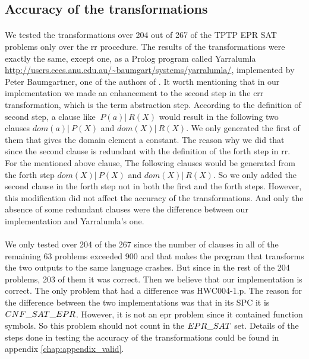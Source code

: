 \subsection{Accuracy of the transformations}
\paragraph{}
We tested the transformations over 204 out of 267 of the TPTP EPR SAT problems only over the \acf{rr} procedure. The results of the transformations were exactly the same, except one, as a Prolog program called Yarralumla \url{http://users.cecs.anu.edu.au/~baumgart/systems/yarralumla/}, implemented by Peter Baumgartner, one of the authors of \cite{BMUG06}. It worth mentioning that in our implementation we made an enhancement to the second step in the \ac{crr} transformation, which is the term abstraction step. According to the definition of second step, a clause like $~P(a)|~R(X)$ would result in the following two clauses $dom(a)|~P(X)$ and $dom(X)|~R(X)$. We only generated the first of them that gives the domain element a constant. The reason why we did that since the second clause is redundant with the definition of the forth step in \ac{rr}. For the mentioned above clause, The following clauses would be generated from the forth step $dom(X)|~P(X)$ and $dom(X)|~R(X)$. So we only added the second clause in the forth step not in both the first and the forth steps. However, this modification did not affect the accuracy of the transformations. And only the absence of some redundant clauses were the difference between our implementation and Yarralumla's one.

\paragraph{}
We only tested over 204 of the 267 since the number of clauses in all of the remaining 63 problems exceeded 900 and that makes the program that transforms the two outputs to the same language crashes. But since in the rest of the 204 problems, 203 of them it was correct. Then we believe that our implementation is correct. The only problem that had a difference was HWC004-1.p. The reason for the difference between the two implementations was that in its SPC it is $CNF\char`_SAT\char`_EPR$. However, it is not an \ac{epr} problem since it contained function symbols. So this problem should not count in the $EPR\char`_SAT$ set. Details of the steps done in testing the accuracy of the transformations could be found in appendix \ref{chap:appendix_valid}.


